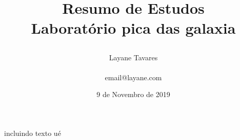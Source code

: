\documentclass[idxtotoc,hyperref,openany]{article} %
\begin{document}

\title{
\begin{center}
{\Huge \textbf{Resumo de Estudos} \\[0.2cm] \Large \textbf{Laboratório pica das galaxia}}\\ %
\end{center}
}
\author{\Huge Layane Tavares \\ \\ \LARGE email@layane.com \\} %
\date{9 de Novembro de 2019} %
\maketitle

incluindo texto ué 


\end{document}
